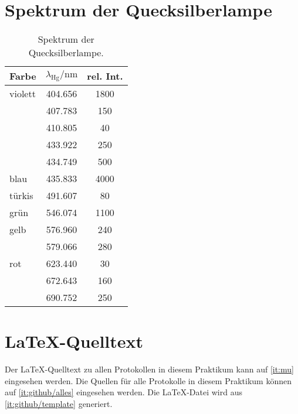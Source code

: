 
\FloatBarrier
\begin{appendix}
    \section{Spektrum der Quecksilberlampe}
    \label{sec:spektrum}

    \begin{table}[htbp]
        \centering
        \begin{tabular}{lSS}
            Farbe & {$\lambda_\text{Hg} / \si{\nano\meter}$} & {rel. Int.} \\
            \hline
            violett & 404.656 & 1800 \\
                    & 407.783 & 150 \\
                    & 410.805 & 40 \\
                    & 433.922 & 250 \\
                    & 434.749 & 500 \\
            blau & 435.833 & 4000 \\
            türkis & 491.607 & 80 \\
            grün & 546.074 & 1100 \\
            gelb & 576.960 & 240 \\
                 & 579.066 & 280 \\
            rot & 623.440 & 30 \\
                & 672.643 & 160 \\
                & 690.752 & 250
        \end{tabular}
        \caption{%
            Spektrum der Quecksilberlampe.
            \cite[P402.6.1]{physik412-Anleitung}
        }
        \label{tab:messdaten:gitterkonstante}
    \end{table}

    \section{\LaTeX-Quelltext}

    Der \LaTeX-Quelltext zu allen Protokollen in diesem Praktikum kann auf
    \ref{it:mu} eingesehen werden. Die Quellen für alle Protokolle in diesem
    Praktikum können auf \ref{it:github/alles} eingesehen werden. Die
    \LaTeX-Datei wird aus \ref{it:github/template} generiert.


\end{appendix}
